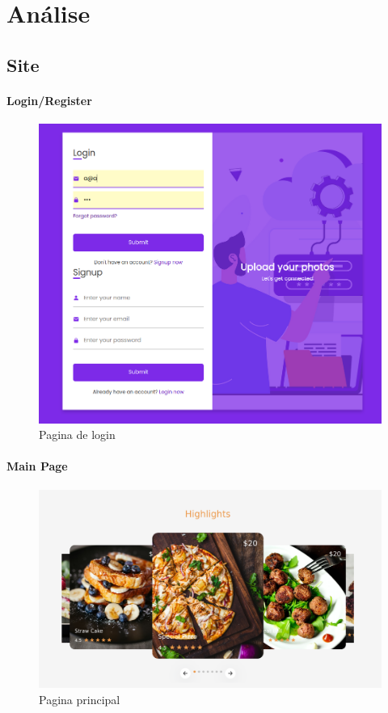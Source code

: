 \documentclass{report}
\begin{document}
\chapter{Análise}
\label{chap.analise}
\section{Site}

\subsubsection{Login/Register}

\begin{figure}[H]
    \centering
    \includegraphics[scale=0.2]{../images/login}
    \caption{Pagina de login}
    \label{fig:login}
\end{figure}

\subsubsection{Main Page}

\begin{figure}[H]
    \centering
    \includegraphics[scale=0.2]{../images/main}
    \caption{Pagina principal}
    \label{fig:Main}
\end{figure}
\end{document}
